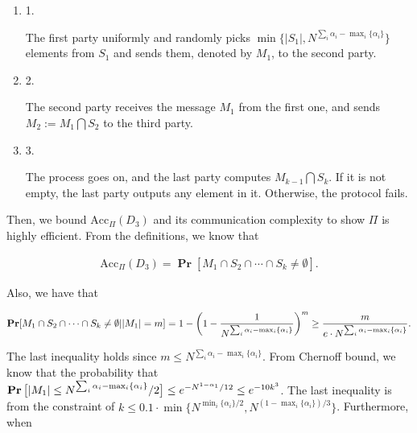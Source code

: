 \begin{enumerate}


\item[] 
1. 


The first party uniformly and randomly picks $\mathop{\min}\{|S_{1}|,N^{\sum_{i}\alpha_{i}-\mathop{\max}_{i}\{\alpha_{i}\}}\}$ elements from $S_{1}$ and sends them, denoted by $M_{1}$, to the second party.\par





\item[] 
2. 


The second party receives the message $M_{1}$ from the first one, and sends $M_{2}:=M_{1}\bigcap S_{2}$ to the third party.\par





\item[] 
3. 


The process goes on, and the last party computes $M_{k-1}\bigcap S_{k}$. If it is not empty, the last party outputs any element in it. Otherwise, the protocol fails.\par





\end{enumerate}


Then, we bound $\text{Acc}_{\Pi}(D_{3})$ and its communication complexity to show $\Pi$ is highly efficient. From the definitions, we know that\par


\[\begin{gathered}
\text{Acc}_{\Pi}(D_{3})=\operatorname*{\mathbf{Pr}}[M_{1}\cap S_{2}\cap\cdots\cap S_{k}\neq\emptyset].
\end{gathered}\]


Also, we have that\par


\[\begin{gathered}
\operatorname*{\mathbf{Pr}}[M_{1}\cap S_{2}\cap\cdots\cap S_{k}\neq\emptyset||M_{1}|=m]=1-\bigg{(}1-\frac{1}{N^{\sum_{i}\alpha_{i}-\mathop{\max}_{i}\{\alpha_{i}\}}}\bigg{)}^{m}\geq\frac{m}{e\cdot N^{\sum_{i}\alpha_{i}-\mathop{\max}_{i}\{\alpha_{i}\}}}.
\end{gathered}\]


The last inequality holds since $m\leq N^{\sum_{i}\alpha_{i}-\mathop{\max}_{i}\{\alpha_{i}\}}$. From Chernoff bound, we know that the probability that $\operatorname*{\mathbf{Pr}}\big{[}|M_{1}|\leq N^{\sum_{i}\alpha_{i}-\mathop{\max}_{i}\{\alpha_{i}\}}/2\big{]}\leq e^{-N^{1-\alpha_{1}}/12}\leq e^{-10k^{3}}$. The last inequality is from the constraint of $k\leq 0.1\cdot\min\{N^{\min_{i}\{\alpha_{i}\}/2},N^{(1-\max_{i}\{\alpha_{i}\})/3}\}$. Furthermore, when\par


